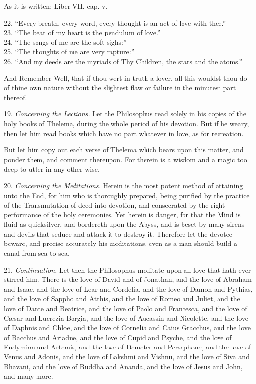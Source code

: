 As it is written: Liber VII. cap. v. ---
\begin{quoting}[indentfirst=false]
22. \enquote{Every breath, every word, every thought is an act of love with thee.} \\
23. \enquote{The beat of my heart is the pendulum of love.} \\
24. \enquote{The songs of me are the soft sighs:} \\
25. \enquote{The thoughts of me are very rapture:} \\
26. \enquote{And my deeds are the myriads of Thy Children, the stars and the atoms.}
\end{quoting}

And Remember Well, that if thou wert in truth a lover, all this wouldst thou do of thine own nature without the slightest flaw or failure in the minutest part thereof.

19. \textit{Concerning the Lections.} Let the Philosophus read solely in his copies of the holy books of Thelema, during the whole period of his devotion. But if he weary, then let him read books which have no part whatever in love, as for recreation.

But let him copy out each verse of Thelema which bears upon this matter, and ponder them, and comment thereupon. For therein is a wisdom and a magic too deep to utter in any other wise.

20. \textit{Concerning the Meditations.} Herein is the most potent method of attaining unto the End, for him who is thoroughly prepared, being purified by the practice of the Transmutation of deed into devotion, and consecrated by the right performance of the holy ceremonies. Yet herein is danger, for that the Mind is fluid as quicksilver, and bordereth upon the Abyss, and is beset by many sirens and devils that seduce and attack it to destroy it. Therefore let the devotee beware, and precise accurately his meditations, even as a man should build a canal from sea to sea.

21. \textit{Continuation.} Let then the Philosophus meditate upon all love that hath ever stirred him. There is the love of David and of Jonathan, and the love of Abraham and Isaac, and the love of Lear and Cordelia, and the love of Damon and Pythias, and the love of Sappho and Atthis, and the love of Romeo and Juliet, and the love of Dante and Beatrice, and the love of Paolo and Francesca, and the love of C\ae{}sar and Lucrezia Borgia, and the love of Aucassin and Nicolette, and the love of Daphnis and Chloe, and the love of Cornelia and Caius Gracchus, and the love of Bacchus and Ariadne, and the love of Cupid and Psyche, and the love of Endymion and Artemis, and the love of Demeter and Persephone, and the love of Venus and Adonis, and the love of Lakshmi and Vishnu, and the love of Siva and Bhavani, and the love of Buddha and Ananda, and the love of Jesus and John, and many more.

